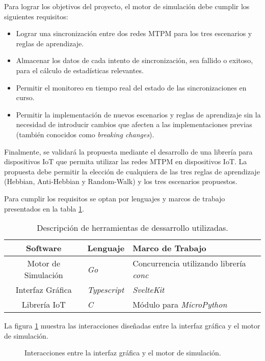 Para lograr los objetivos del proyecto, el motor de simulación debe cumplir los siguientes requisitos:
\begin{itemize}
    \item Lograr una sincronización entre dos redes MTPM para los tres escenarios y reglas de aprendizaje.
    \item Almacenar los datos de cada intento de sincronización, sea fallido o exitoso, para el cálculo de estadísticas relevantes. 
    \item Permitir el monitoreo en tiempo real del estado de las sincronizaciones en curso.
    \item Permitir la implementación de nuevos escenarios y reglas de aprendizaje sin la necesidad de introducir cambios que afecten a las implementaciones previas (también conocidos como \textit{breaking changes}).
\end{itemize}

Finalmente, se validará la propuesta mediante el desarrollo de una librería para dispositivos IoT que permita utilizar las redes MTPM en dispositivos IoT. La propuesta debe permitir la elección de cualquiera de las tres reglas de aprendizaje (Hebbian, Anti-Hebbian y Random-Walk) y los tres escenarios propuestos. 

Para cumplir los requisitos se optan por lenguajes y marcos de trabajo presentados en la tabla \ref{tabla:framework-mtpm}. 
\noindent\begin{table}[H]
    \centering
    \begin{tabular}{|c|p{4cm}|p{6cm}|}
    \hline
    \textbf{Software} & \textbf{Lenguaje} & \textbf{Marco de Trabajo} \\
    \hline
    Motor de Simulación & \textit{Go} & Concurrencia utilizando librería \textit{conc}\\
    \hline
    Interfaz Gráfica & \textit{Typescript} & \textit{SvelteKit}\\
    \hline
    Librería IoT & \textit{C} & Módulo para \textit{MicroPython}\\
    \hline
    \end{tabular}
    \caption{Descripción de herramientas de dessarrollo utilizadas.}
    \label{tabla:framework-mtpm}
\end{table}

La figura \ref{fig:back-front-process} muestra las interacciones diseñadas entre la interfaz gráfica y el motor de simulación.
\begin{figure}[H]
    \centering
    \noindent
    \caption{Interacciones entre la interfaz gráfica y el motor de simulación.}
    \label{fig:back-front-process}
\end{figure}

